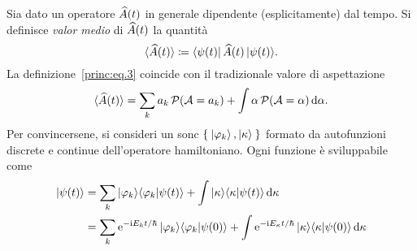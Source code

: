Sia dato un operatore $\widehat{A}(t)$ in generale dipendente (esplicitamente) dal tempo.
Si definisce 	\emph{valor medio} di $\widehat{A}(t)$ la quantità
\begin{equation}\label{princ:eq.3}
\braket{\widehat{A}(t)}\coloneqq\bra{\psi(t)}\widehat{A}(t)\ket{\psi(t)}\!.
\end{equation}
La definizione~\eqref{princ:eq.3} coincide con il tradizionale valore di aspettazione
\begin{equation}
\braket{\widehat{A}(t)}=\sum_k a_k\,\mathcal{P}(\mathcal{A}=a_k)+
\int\alpha\,\mathcal{P}(\mathcal{A}=\alpha)\mathop{}\!\mathrm{d}\alpha.
\end{equation}
Per convincersene, si consideri un \ac{sonc} $\Set{\Ket{\varphi_k},\Ket{\kappa}}$ formato da autofunzioni {\color{red}discrete e continue} dell'operatore hamiltoniano.
Ogni funzione è sviluppabile come
\begin{equation}
\begin{aligned}
\ket{\psi(t)}&=\sum_k\ket{\varphi_k}\!\braket{\varphi_k|\psi(t)}+
\int \ket{\kappa}\!\braket{\kappa|\psi(t)}\mathop{}\!\mathrm{d} \kappa\\
&=\sum_k\mathrm{e}^{-\mathrm{i} E_kt/\hbar}\ket{\varphi_k}\!\braket{\varphi_k|\psi(0)}+
\int \mathrm{e}^{-\mathrm{i} E_\kappa t/\hbar}\ket{\kappa}\!\braket{\kappa|\psi(0)}\mathop{}\!\mathrm{d} \kappa
\end{aligned}
\end{equation}